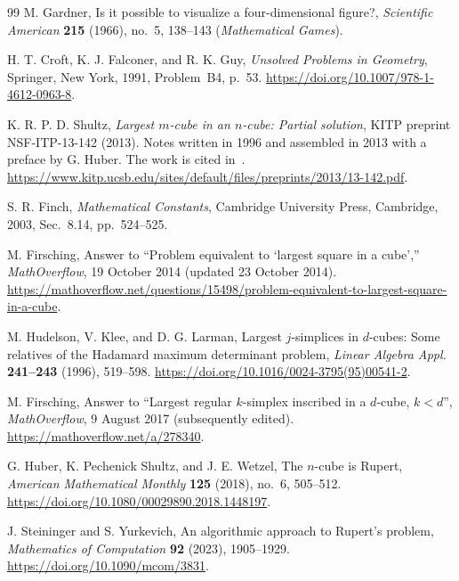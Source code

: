 \documentclass[11pt]{article}
\numberwithin{equation}{section}
\theoremstyle{definition}
\theoremstyle{definition}
\begin{document}
\medskip
\begin{thebibliography}{99}
M. Gardner,
Is it possible to visualize a four-dimensional figure?,
\emph{Scientific American} \textbf{215} (1966), no.~5, 138--143
(\emph{Mathematical Games}).

H. T. Croft, K. J. Falconer, and R. K. Guy,
\emph{Unsolved Problems in Geometry},
Springer, New York, 1991, Problem~B4, p.~53.
\url{https://doi.org/10.1007/978-1-4612-0963-8}.

K. R. P. D. Shultz,
\emph{Largest $m$-cube in an $n$-cube: Partial solution},
KITP preprint NSF-ITP-13-142 (2013).
Notes written in 1996 and assembled in 2013 with a preface by G. Huber.
The work is cited in~\cite{HSW2018}.
\url{https://www.kitp.ucsb.edu/sites/default/files/preprints/2013/13-142.pdf}.

S. R. Finch,
\emph{Mathematical Constants},
Cambridge University Press, Cambridge, 2003, Sec.~8.14, pp.~524--525.

M. Firsching,
Answer to ``Problem equivalent to `largest square in a cube',''
\emph{MathOverflow}, 19 October 2014 (updated 23 October 2014).
\url{https://mathoverflow.net/questions/15498/problem-equivalent-to-largest-square-in-a-cube}.

M. Hudelson, V. Klee, and D. G. Larman,
Largest $j$-simplices in $d$-cubes: Some relatives of the Hadamard
maximum determinant problem,
\emph{Linear Algebra Appl.} \textbf{241--243} (1996), 519--598.
\url{https://doi.org/10.1016/0024-3795(95)00541-2}.

M. Firsching,
Answer to ``Largest regular $k$-simplex inscribed in a $d$-cube,
$k<d$'',
\emph{MathOverflow}, 9 August 2017 (subsequently edited).
\url{https://mathoverflow.net/a/278340}.

G. Huber, K. Pechenick Shultz, and J. E. Wetzel,
The $n$-cube is Rupert,
\emph{American Mathematical Monthly} \textbf{125} (2018), no.~6, 505--512.
\url{https://doi.org/10.1080/00029890.2018.1448197}.

J. Steininger and S. Yurkevich,
An algorithmic approach to Rupert's problem,
\emph{Mathematics of Computation} \textbf{92} (2023), 1905--1929.
\url{https://doi.org/10.1090/mcom/3831}.

\end{thebibliography}
\end{document}
